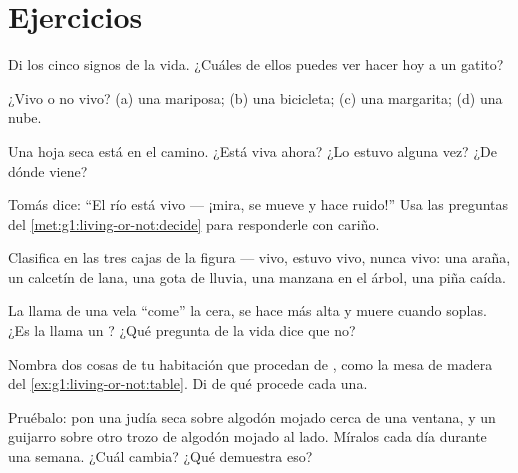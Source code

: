 \section{Ejercicios}

\begin{exercise}[$\star$]\label{exo:g1:living-or-not:1}
Di los cinco signos de la vida. ¿Cuáles de ellos puedes ver hacer hoy
a un gatito?
\end{exercise}

\begin{exercise}[$\star$]\label{exo:g1:living-or-not:2}
¿Vivo o no vivo? (a) una mariposa; (b) una bicicleta; (c) una
margarita; (d) una nube.
\end{exercise}

\begin{exercise}[$\star$]\label{exo:g1:living-or-not:3}
Una hoja seca está en el camino. ¿Está viva ahora? ¿Lo estuvo alguna
vez? ¿De dónde viene?
\end{exercise}

\begin{exercise}[$\star$]\label{exo:g1:living-or-not:4}
Tomás dice: ``El río está vivo --- ¡mira, se mueve y hace ruido!''
Usa las preguntas del \cref{met:g1:living-or-not:decide} para
responderle con cariño.
\end{exercise}

\begin{exercise}[$\star$]\label{exo:g1:living-or-not:5}
Clasifica en las tres cajas de la figura --- vivo, estuvo vivo, nunca
vivo: una araña, un calcetín de lana, una gota de lluvia, una manzana
en el árbol, una piña caída.
\end{exercise}

\begin{exercise}[$\star$]\label{exo:g1:living-or-not:6}
La llama de una vela ``come'' la cera, se hace más alta y muere
cuando soplas. ¿Es la llama un ? ¿Qué pregunta de la vida
dice que no?
\end{exercise}

\begin{exercise}[$\star$]\label{exo:g1:living-or-not:7}
Nombra dos cosas de tu habitación que procedan de , como
la mesa de madera del \cref{ex:g1:living-or-not:table}. Di de qué
 procede cada una.
\end{exercise}

\begin{exercise}[$\star$]\label{exo:g1:living-or-not:8}
Pruébalo: pon una judía seca sobre algodón mojado cerca de una
ventana, y un guijarro sobre otro trozo de algodón mojado al lado.
Míralos cada día durante una semana. ¿Cuál cambia? ¿Qué demuestra eso?
\end{exercise}

